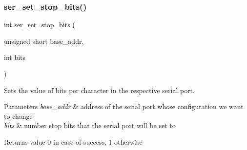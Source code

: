 \subsubsection{\texorpdfstring{ser\+\_\+set\+\_\+stop\+\_\+bits()}{ser\_set\_stop\_bits()}}
{\footnotesize\ttfamily int ser\+\_\+set\+\_\+stop\+\_\+bits (\begin{DoxyParamCaption}\item[{unsigned short}]{base\+\_\+addr,  }\item[{int}]{bits }\end{DoxyParamCaption})}



Sets the value of bits per character in the respective serial port. 


\begin{DoxyParams}{Parameters}
{\em base\+\_\+addr} & address of the serial port whose configuration we want to change\\
\hline
{\em bits} & number stop bits that the serial port will be set to\\
\hline
\end{DoxyParams}
\begin{DoxyReturn}{Returns}
value 0 in case of success, 1 otherwise 
\end{DoxyReturn}
